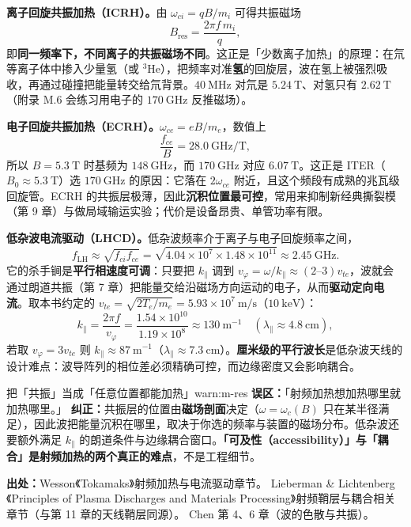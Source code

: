\textbf{离子回旋共振加热（ICRH）。}由 $\omega_{ci}=qB/m_i$ 可得共振磁场
\[
B_{\mathrm{res}}=\frac{2\pi f\,m_i}{q},
\]
即\textbf{同一频率下，不同离子的共振磁场不同}。这正是「少数离子加热」的原理：在氘等离子体中掺入少量氢（或 $^3\mathrm{He}$），把频率对准\textbf{氢}的回旋层，波在氢上被强烈吸收，再通过碰撞把能量转交给氘背景。$40\ \mathrm{MHz}$ 对氘是 $5.24\ \mathrm{T}$、对氢只有 $2.62\ \mathrm{T}$（附录 M.6 会练习用电子的 $170\ \mathrm{GHz}$ 反推磁场）。

\textbf{电子回旋共振加热（ECRH）。}$\omega_{ce}=eB/m_e$，数值上
\[
\frac{f_{ce}}{B}=28.0\ \mathrm{GHz/T},
\]
所以 $B=5.3\ \mathrm{T}$ 时基频为 $148\ \mathrm{GHz}$，而 $170\ \mathrm{GHz}$ 对应 $6.07\ \mathrm{T}$。这正是 ITER（$B_0\approx5.3\ \mathrm{T}$）选 $170\ \mathrm{GHz}$ 的原因：它落在 $2\omega_{ce}$ 附近，且这个频段有成熟的兆瓦级回旋管。ECRH 的共振层极薄，因此\textbf{沉积位置最可控}，常用来抑制新经典撕裂模（第 9 章）与做局域输运实验；代价是设备昂贵、单管功率有限。

\textbf{低杂波电流驱动（LHCD）。}低杂波频率介于离子与电子回旋频率之间，
\[
f_{\mathrm{LH}}\approx\sqrt{f_{ci}f_{ce}}
=\sqrt{4.04\times10^{7}\times1.48\times10^{11}}\approx2.45\ \mathrm{GHz}.
\]
它的杀手锏是\textbf{平行相速度可调}：只要把 $k_\parallel$ 调到 $v_\varphi=\omega/k_\parallel\approx(2\text{--}3)v_{te}$，波就会通过朗道共振（第 7 章）把能量交给沿磁场方向运动的电子，从而\textbf{驱动定向电流}。取本书约定的 $v_{te}=\sqrt{2T_e/m_e}=5.93\times10^{7}\ \mathrm{m/s}$（$10\ \mathrm{keV}$）：
\[
k_\parallel=\frac{2\pi f}{v_\varphi}
=\frac{1.54\times10^{10}}{1.19\times10^{8}}\approx130\ \mathrm{m^{-1}}
\quad(\lambda_\parallel\approx4.8\ \mathrm{cm}),
\]
若取 $v_\varphi=3v_{te}$ 则 $k_\parallel\approx87\ \mathrm{m^{-1}}$（$\lambda_\parallel\approx7.3\ \mathrm{cm}$）。\textbf{厘米级的平行波长}是低杂波天线的设计难点：波导阵列的相位差必须精确可控，而边缘密度又会影响耦合。

\begin{warning}{把「共振」当成「任意位置都能加热」}{warn:m-res}
\textbf{误区：}「射频加热想加热哪里就加热哪里。」
\textbf{纠正：}共振层的位置由\textbf{磁场剖面}决定（$\omega=\omega_c(B)$ 只在某半径满足），因此波把能量沉积在哪里，取决于你选的频率与装置的磁场分布。低杂波还要额外满足 $k_\parallel$ 的朗道条件与边缘耦合窗口。\textbf{「可及性（accessibility）」与「耦合」是射频加热的两个真正的难点}，不是工程细节。
\end{warning}

{\footnotesize
\textbf{出处：}Wesson《Tokamaks》射频加热与电流驱动章节。
Lieberman \& Lichtenberg《Principles of Plasma Discharges and Materials Processing》射频鞘层与耦合相关章节（与第 11 章的天线鞘层同源）。
Chen 第 4、6 章（波的色散与共振）。
}


